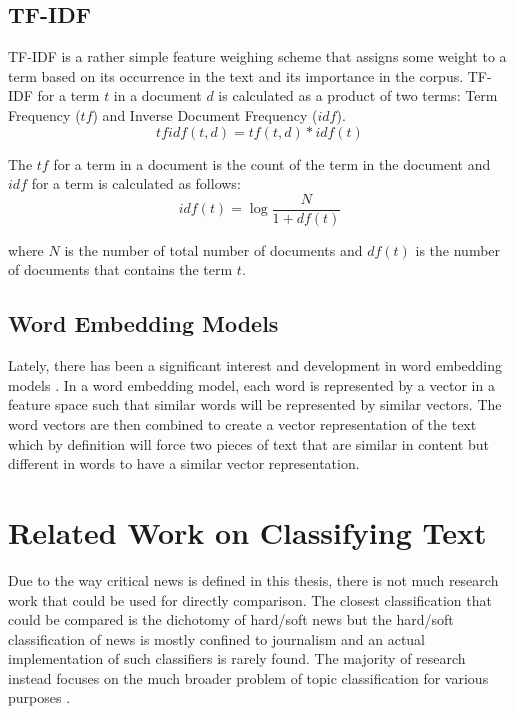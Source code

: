 \subsection{TF-IDF}
TF-IDF\cite{sparck1972statistical} is a rather simple feature weighing scheme that assigns some weight to a term based on its occurrence in the text and its importance in the corpus. TF-IDF for a term $t$ in a document $d$ is calculated as a product of two terms: Term Frequency ($tf$) and Inverse Document Frequency ($idf$). 
\begin{equation}
    \label{eq:tf_idf_equation}
    tfidf(t, d) = tf(t, d) * idf(t)
\end{equation}

The $tf$ for a term in a document is the count of the term in the document and $idf$ for a term is calculated as follows:
\begin{equation}
    \label{eq:idf_equation}
    idf(t) = \log{\frac{N}{1 + df(t)}}
\end{equation}

\noindent
where $N$ is the number of total number of documents and $df(t)$ is the number of documents that contains the term $t$.

\subsection{Word Embedding Models}
Lately, there has been a significant interest and development in word embedding models \cite{mikolov2013distributed, pennington2014glove, bojanowski2017enriching}. In a word embedding model, each word is represented by a vector in a feature space such that similar words will be represented by similar vectors\cite{mikolov2013distributed}. The word vectors are then combined to create a vector representation of the text which by definition will force two pieces of text that are similar in content but different in words to have a similar vector representation.

\section{Related Work on Classifying Text} \label{related_works}
Due to the way critical news is defined in this thesis, there is not much research work that could be used for directly comparison. The closest classification that could be compared is the dichotomy of hard/soft news but the hard/soft classification of news is mostly confined to journalism and an actual implementation of such classifiers is rarely found. The majority of research instead focuses on the much broader problem of topic classification for various purposes \cite{wang2012baselines, lee2011twitter, joachims1998text, nigam2000text}.


